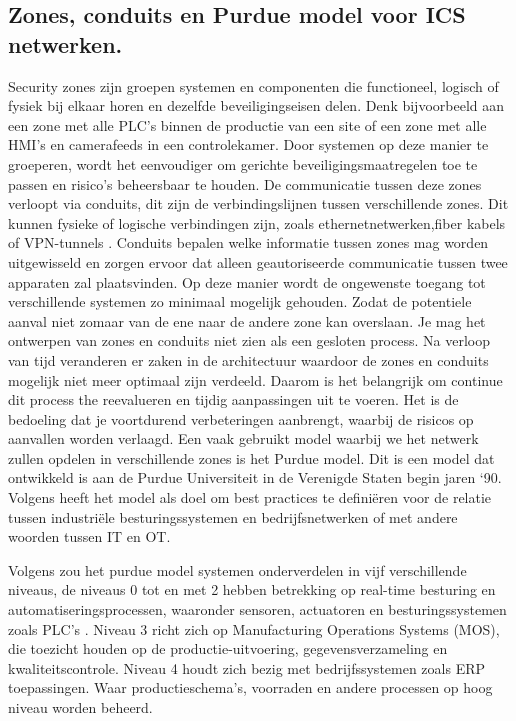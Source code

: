 \subsection{Zones, conduits en Purdue model voor ICS netwerken.}
Security zones zijn groepen systemen en componenten die functioneel, logisch of fysiek bij elkaar horen en dezelfde beveiligingseisen delen. Denk bijvoorbeeld aan een zone met alle PLC’s binnen de productie van een site of een zone met alle HMI’s en camerafeeds in een controlekamer. Door systemen op deze manier te groeperen, wordt het eenvoudiger om gerichte beveiligingsmaatregelen toe te passen en risico’s beheersbaar te houden. De communicatie tussen deze zones verloopt via conduits, dit zijn de verbindingslijnen tussen verschillende zones. Dit kunnen fysieke of logische verbindingen zijn, zoals ethernetnetwerken,fiber kabels of VPN-tunnels . Conduits bepalen welke informatie tussen zones mag worden uitgewisseld en zorgen ervoor dat alleen geautoriseerde communicatie tussen twee apparaten zal plaatsvinden. Op deze manier wordt de ongewenste toegang tot verschillende systemen zo minimaal mogelijk gehouden. Zodat de potentiele aanval niet zomaar van de ene naar de andere zone kan overslaan. \autocite{Dragos2023}
Je mag het ontwerpen van zones en conduits niet zien als een gesloten process. Na verloop van tijd veranderen er zaken in de architectuur waardoor de zones en conduits mogelijk niet meer optimaal zijn verdeeld. Daarom is het belangrijk om continue dit process the reevalueren en tijdig aanpassingen uit te voeren. Het is de bedoeling dat je voortdurend verbeteringen aanbrengt, waarbij de risicos op aanvallen worden verlaagd. \autocite{Incibe2018}
Een vaak gebruikt model waarbij we het netwerk zullen opdelen in verschillende zones is het Purdue model. Dit is een model dat ontwikkeld is aan de Purdue Universiteit in de Verenigde Staten begin jaren `90. Volgens \textcite{Mathezer2021}heeft het model als doel om best practices te definiëren voor de relatie tussen industriële besturingssystemen en bedrijfsnetwerken of met andere woorden tussen IT en OT. 

Volgens \textcite{Commers2025} zou het purdue model systemen onderverdelen in vijf verschillende niveaus, de niveaus 0 tot en met 2 hebben betrekking op real-time besturing en automatiseringsprocessen, waaronder sensoren, actuatoren en besturingssystemen zoals PLC’s . Niveau 3 richt zich op Manufacturing Operations Systems (MOS), die toezicht houden op de productie-uitvoering, gegevensverzameling en kwaliteitscontrole. Niveau 4 houdt zich bezig met bedrijfssystemen zoals ERP toepassingen. Waar productieschema's, voorraden en andere processen op hoog niveau worden beheerd.

